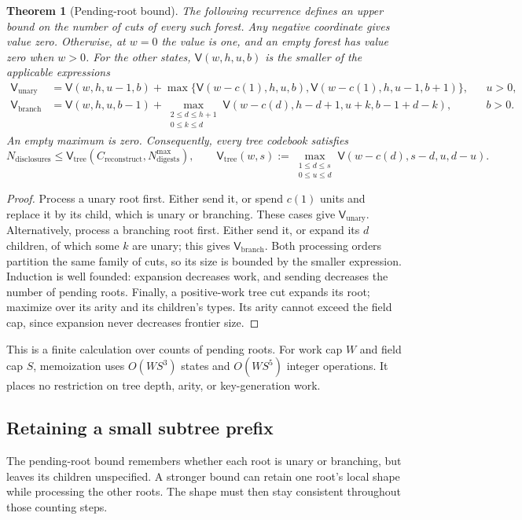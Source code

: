 \documentclass[10pt]{article}
\newtheorem{theorem}[proposition]{Theorem}
\newcommand{\disclosurecount}{N_{\mathrm{disclosures}}}
\newcommand{\digestbudget}{N_{\mathrm{digests}}^{\max}}
\newcommand{\reconstructcost}{C_{\mathrm{reconstruct}}}
\begin{document}
\begin{theorem}[Pending-root bound]\label{thm:pending-root-bound}
The following recurrence defines an upper bound on the number of cuts of every such forest. Any negative coordinate gives value zero. Otherwise, at $w=0$ the value is one, and an empty forest has value zero when $w>0$. For the other states, $\mathsf V(w,h,u,b)$ is the smaller of the applicable expressions
\begin{align*}
 \mathsf V_{\mathrm{unary}}&=\mathsf V(w,h,u-1,b)+\max\{\mathsf V(w-c(1),h,u,b),\mathsf V(w-c(1),h,u-1,b+1)\}, &&u>0,\\
 \mathsf V_{\mathrm{branch}}&=\mathsf V(w,h,u,b-1)+\max_{\substack{2\le d\le h+1\\0\le k\le d}}\mathsf V(w-c(d),h-d+1,u+k,b-1+d-k), &&b>0.
\end{align*}
An empty maximum is zero. Consequently, every tree codebook satisfies
\[
 \disclosurecount\le\mathsf V_{\mathrm{tree}}(\reconstructcost,\digestbudget),\qquad \mathsf V_{\mathrm{tree}}(w,s):=\max_{\substack{1\le d\le s\\0\le u\le d}}\mathsf V(w-c(d),s-d,u,d-u).
\]
\end{theorem}
\begin{proof}
Process a unary root first. Either send it, or spend $c(1)$ units and replace it by its child, which is unary or branching. These cases give $\mathsf V_{\mathrm{unary}}$. Alternatively, process a branching root first. Either send it, or expand its $d$ children, of which some $k$ are unary; this gives $\mathsf V_{\mathrm{branch}}$. Both processing orders partition the same family of cuts, so its size is bounded by the smaller expression. Induction is well founded: expansion decreases work, and sending decreases the number of pending roots. Finally, a positive-work tree cut expands its root; maximize over its arity and its children's types. Its arity cannot exceed the field cap, since expansion never decreases frontier size.
\end{proof}
This is a finite calculation over counts of pending roots. For work cap $W$ and field cap $S$, memoization uses $O(WS^3)$ states and $O(WS^5)$ integer operations. It places no restriction on tree depth, arity, or key-generation work.

\subsection{Retaining a small subtree prefix}\label{sec:prefix-bound}
The pending-root bound remembers whether each root is unary or branching, but leaves its children unspecified. A stronger bound can retain one root's local shape while processing the other roots. The shape must then stay consistent throughout those counting steps.
\end{document}
